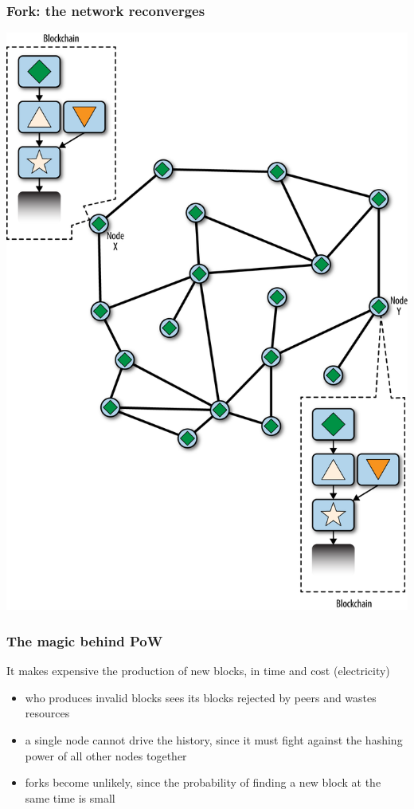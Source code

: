 \documentclass[11pt]{beamer}  %
\begin{document}
\begin{frame}\frametitle{Fork: the network reconverges}

  \begin{center}
    \includegraphics[scale=0.47,clip=false]{pictures/mbc2_1006.png}
  \end{center}

\end{frame}

\begin{frame}\frametitle{The magic behind PoW}

  \begin{greenbox}{}
    It makes expensive the production of new blocks, in time and cost (electricity)
    \begin{itemize}
    \item who produces invalid blocks sees its blocks rejected by peers and wastes resources
    \item a single node cannot drive the history, since it must fight against
      the hashing power of all other nodes together
    \item forks become unlikely, since the probability of finding a new block at the same time
      is small
    \end{itemize}
  \end{greenbox}

\end{frame}
\end{document}

